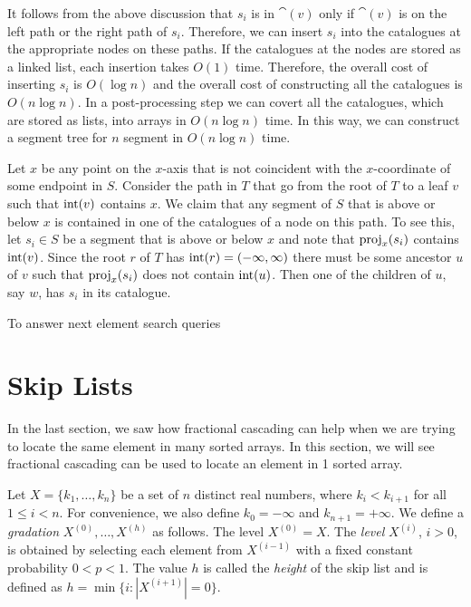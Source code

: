 {It follows from the above discussion that $s_i$ is in $\cat(v)$ only
if $\cat(v)$ is on the left path or the right path of $s_i$.
Therefore, we can insert $s_i$ into the catalogues at the appropriate
nodes on these paths.  If the catalogues at the nodes are stored as a
linked list, each insertion takes $O(1)$ time.  Therefore, the overall
cost of inserting $s_i$ is $O(\log n)$ and the overall cost of
constructing all the catalogues is $O(n\log n)$.  In a post-processing
step we can covert all the catalogues, which are stored as lists, into
arrays in $O(n\log n)$ time.  In this way, we can construct a segment
tree for $n$ segment in $O(n\log n)$ time.

Let $x$ be any point on the $x$-axis that is not coincident with the
$x$-coordinate of some endpoint in $S$.  Consider the path in $T$ that
go from the root of $T$ to a leaf $v$ such that $\mathrm{int}(v)$ contains
$x$.  We claim that any segment of $S$ that is above or below $x$ is
contained in one of the catalogues of a node on this path.  To see
this, let $s_i\in S$ be a segment that is above or below $x$ and note
that $\mathrm{proj}_x(s_i)$ contains $\mathrm{int}(v)$.  Since the root $r$ of $T$
has $\mathrm{int}(r)=(-\infty,\infty)$ there must be some ancestor $u$ of $v$
such that $\mathrm{proj}_x(s_i)$ does not contain $\mathrm{int}(u)$.  Then one of the
children of $u$, say $w$, has $s_i$ in its catalogue.

To answer next element search queries 
}



\section{Skip Lists}

In the last section, we saw how fractional cascading can help when we
are trying to locate the same element in many sorted arrays.  In this
section, we will see fractional cascading can be used to locate an
element in 1 sorted array.

Let $X=\{k_1,\ldots,k_n\}$ be a set of $n$ distinct real numbers,
where $k_i<k_{i+1}$ for all $1\le i< n$.  For convenience, we also
define $k_0=-\infty$ and $k_{n+1}=+\infty$.  We define a
\emph{gradation} $X^{(0)},\ldots,X^{(h)}$ as follows.  The level
$X^{(0)}=X$.  The \emph{level} $X^{(i)}$, $i>0$, is obtained by
selecting each element from $X^{(i-1)}$ with a fixed constant
probability $0< p<1$.  The value $h$ is called the \emph{height} of
the skip list and is defined as $h=\min\{i: |X^{(i+1)}|=0\}$.

